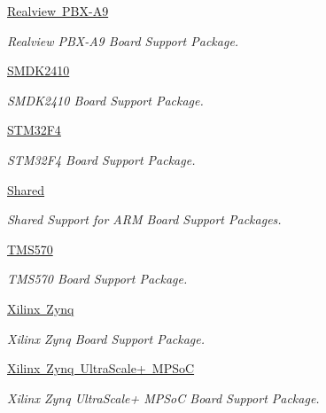 \begin{DoxyCompactItemize}
\mbox{\hyperlink{group__RTEMSBSPsARMRealviewPBXA9}{Realview P\+B\+X-\/\+A9}}
\begin{DoxyCompactList}\small\item\em Realview P\+B\+X-\/\+A9 Board Support Package. \end{DoxyCompactList}\item 
\mbox{\hyperlink{group__RTEMSBSPsARMSMDK2410}{S\+M\+D\+K2410}}
\begin{DoxyCompactList}\small\item\em S\+M\+D\+K2410 Board Support Package. \end{DoxyCompactList}\item 
\mbox{\hyperlink{group__RTEMSBSPsARMSTM32F4}{S\+T\+M32\+F4}}
\begin{DoxyCompactList}\small\item\em S\+T\+M32\+F4 Board Support Package. \end{DoxyCompactList}\item 
\mbox{\hyperlink{group__RTEMSBSPsARMShared}{Shared}}
\begin{DoxyCompactList}\small\item\em Shared Support for A\+RM Board Support Packages. \end{DoxyCompactList}\item 
\mbox{\hyperlink{group__RTEMSBSPsARMTMS570}{T\+M\+S570}}
\begin{DoxyCompactList}\small\item\em T\+M\+S570 Board Support Package. \end{DoxyCompactList}\item 
\mbox{\hyperlink{group__RTEMSBSPsARMZynq}{Xilinx Zynq}}
\begin{DoxyCompactList}\small\item\em Xilinx Zynq Board Support Package. \end{DoxyCompactList}\item 
\mbox{\hyperlink{group__RTEMSBSPsARMZynqMP}{Xilinx Zynq Ultra\+Scale+ M\+P\+SoC}}
\begin{DoxyCompactList}\small\item\em Xilinx Zynq Ultra\+Scale+ M\+P\+SoC Board Support Package. \end{DoxyCompactList}\end{DoxyCompactItemize}
